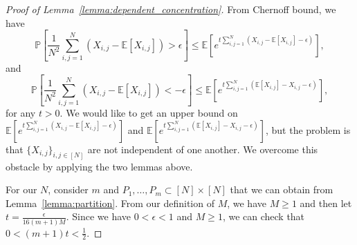 \begin{proof}[Proof of Lemma~\ref{lemma:dependent_concentration}]\label{proof:dependent_concentration}
From Chernoff bound, we have
\begin{equation*}
\mathbb{P} \left[\frac{1}{N^2} \sum_{i,j=1}^N (X_{i,j}-\mathbb{E}[X_{i,j}]) > \epsilon \right] \leq  \mathbb{E}\left [e^{t \sum_{i,j=1}^N (X_{i,j} - \mathbb{E}[X_{i,j}] - \epsilon)} \right ],
\end{equation*}
and
\begin{equation*}
\mathbb{P} \left [\frac{1}{N^2} \sum_{i,j=1}^N (X_{i,j}-\mathbb{E}[X_{i,j}]) < -\epsilon \right] \leq  \mathbb{E}\left [e^{t \sum_{i,j=1}^N ( \mathbb{E}[X_{i,j}] - X_{i,j} - \epsilon)} \right ],
\end{equation*}
for any $t>0$.
We would like to get an upper bound on $\mathbb{E} \left [e^{t \sum_{i,j=1}^N (X_{i,j} - \mathbb{E}[X_{i,j}] - \epsilon)} \right ]$ and $\mathbb{E} \left [e^{t \sum_{i,j=1}^N ( \mathbb{E}[X_{i,j}]-X_{i,j} - \epsilon)} \right ]$, but the problem is that $\{X_{i,j}\}_{i,j \in [N]}$ are not independent of one another. We overcome this obstacle by applying the two lemmas above.

For our $N$, consider $m$ and $P_1, \dots, P_m \subset [N] \times [N]$ that we can obtain from Lemma~\ref{lemma:partition}. 
From our definition of $M$, we have $M \geq 1$ and then let $t = \frac{\epsilon}{16(m+1)M}$. Since we have $0 < \epsilon < 1$ and $M\geq 1$, we can check that $0 < (m+1)t < \frac{1}{2}$.


\end{proof}
